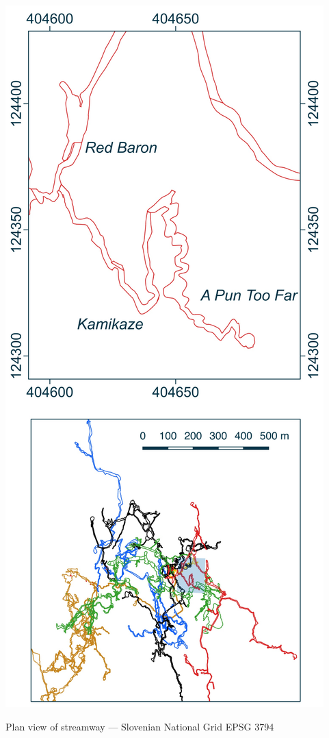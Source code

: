 \begin{marginfigure}
	\includegraphics[width= \linewidth]{images/little_insets/pun_too_far_inset.pdf}
	\caption*{Plan view of \protect{} streamway --- Slovenian National Grid EPSG 3794}
	\label{Pun too Far}
\end{marginfigure}


